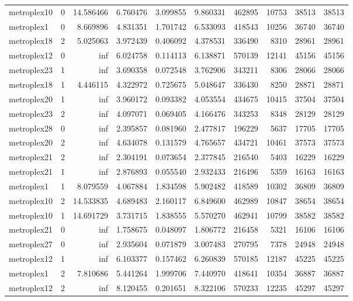 \begin{longtable}{|l|r|r|r|r|r|r|r|r|r|}
metroplex10 & 0 & 14.586466 & 6.760476 & 3.099855 & 9.860331 & 462895 & 10753 & 38513 & 38513 \\
metroplex1 & 0 & 8.669896 & 4.831351 & 1.701742 & 6.533093 & 418543 & 10256 & 36740 & 36740 \\
metroplex18 & 2 & 5.025063 & 3.972439 & 0.406092 & 4.378531 & 336490 & 8310 & 28961 & 28961 \\
metroplex12 & 0 & inf & 6.024758 & 0.114113 & 6.138871 & 570139 & 12141 & 45156 & 45156 \\
metroplex23 & 1 & inf & 3.690358 & 0.072548 & 3.762906 & 343211 & 8306 & 28066 & 28066 \\
metroplex18 & 1 & 4.446115 & 4.322972 & 0.725675 & 5.048647 & 336430 & 8250 & 28871 & 28871 \\
metroplex20 & 1 & inf & 3.960172 & 0.093382 & 4.053554 & 434675 & 10415 & 37504 & 37504 \\
metroplex23 & 2 & inf & 4.097071 & 0.069405 & 4.166476 & 343253 & 8348 & 28129 & 28129 \\
metroplex28 & 0 & inf & 2.395857 & 0.081960 & 2.477817 & 196229 & 5637 & 17705 & 17705 \\
metroplex20 & 2 & inf & 4.634078 & 0.131579 & 4.765657 & 434721 & 10461 & 37573 & 37573 \\
metroplex21 & 2 & inf & 2.304191 & 0.073654 & 2.377845 & 216540 & 5403 & 16229 & 16229 \\
metroplex21 & 1 & inf & 2.876893 & 0.055540 & 2.932433 & 216496 & 5359 & 16163 & 16163 \\
metroplex1 & 1 & 8.079559 & 4.067884 & 1.834598 & 5.902482 & 418589 & 10302 & 36809 & 36809 \\
metroplex10 & 2 & 14.533835 & 4.689483 & 2.160117 & 6.849600 & 462989 & 10847 & 38654 & 38654 \\
metroplex10 & 1 & 14.691729 & 3.731715 & 1.838555 & 5.570270 & 462941 & 10799 & 38582 & 38582 \\
metroplex21 & 0 & inf & 1.758675 & 0.048097 & 1.806772 & 216458 & 5321 & 16106 & 16106 \\
metroplex27 & 0 & inf & 2.935604 & 0.071879 & 3.007483 & 270795 & 7378 & 24948 & 24948 \\
metroplex12 & 1 & inf & 6.103377 & 0.157462 & 6.260839 & 570185 & 12187 & 45225 & 45225 \\
metroplex1 & 2 & 7.810686 & 5.441264 & 1.999706 & 7.440970 & 418641 & 10354 & 36887 & 36887 \\
metroplex12 & 2 & inf & 8.120455 & 0.201651 & 8.322106 & 570233 & 12235 & 45297 & 45297 \\

\end{longtable}
